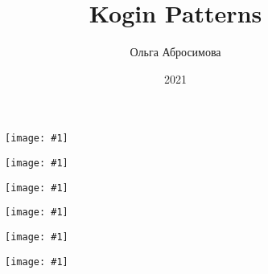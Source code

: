 \documentclass[12pt,twoside,openany,b5paper]{book}
\newcommand{\figp}[1]{
  \begin{figure}
  \begin{center}
  \texttt{[image: \#1]}
  \end{center}
  \end{figure}
}
\begin{document}
\title{Kogin Patterns}
\author{Ольга Абросимова}
\date{2021}
\maketitle

\figp{1}

\figp{2}

\figp{3}

\figp{4}

\figp{5}

\figp{6}
\end{document}
